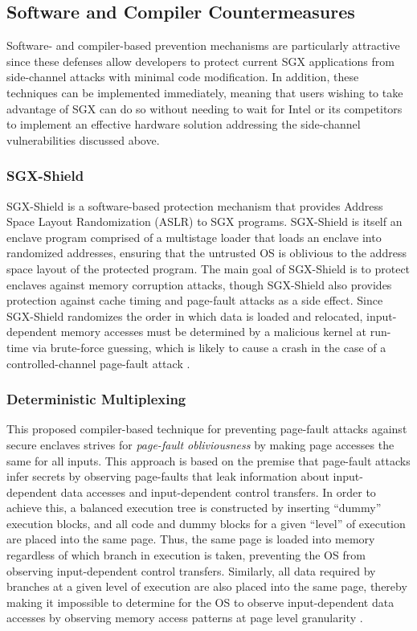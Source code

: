 \subsection{Software and Compiler Countermeasures}

Software- and compiler-based prevention mechanisms are particularly attractive since these defenses allow developers to protect current SGX applications from side-channel attacks with minimal code modification. In addition, these techniques can be implemented immediately, meaning that users wishing to take advantage of SGX can do so without needing to wait for Intel or its competitors to implement an effective hardware solution addressing the side-channel vulnerabilities discussed above.

\subsubsection{SGX-Shield}

SGX-Shield is a software-based protection mechanism that provides Address Space Layout Randomization (ASLR) to SGX programs. SGX-Shield is itself an enclave program comprised of a multistage loader that loads an enclave into randomized addresses, ensuring that the untrusted OS is oblivious to the address space layout of the protected program. The main goal of SGX-Shield is to protect enclaves against memory corruption attacks, though SGX-Shield also provides protection against cache timing and page-fault attacks as a side effect. Since SGX-Shield randomizes the order in which data is loaded and relocated, input-dependent memory accesses must be determined by a malicious kernel at run-time via brute-force guessing, which is likely to cause a crash in the case of a controlled-channel page-fault attack \cite{seo_sgx-shield:_2017}. 

\subsubsection{Deterministic Multiplexing}

This proposed compiler-based technique for preventing page-fault attacks against secure enclaves strives for \emph{page-fault obliviousness} by making page accesses the same for all inputs. This approach is based on the premise that page-fault attacks infer secrets by observing page-faults that leak information about input-dependent data accesses and input-dependent control transfers. In order to achieve this, a balanced execution tree is constructed by inserting ``dummy'' execution blocks, and all code and dummy blocks for a given ``level'' of execution are placed into the same page. Thus, the same page is loaded into memory regardless of which branch in execution is taken, preventing the OS from observing input-dependent control transfers. Similarly, all data required by branches at a given level of execution are also placed into the same page, thereby making it impossible to determine for the OS to observe input-dependent data accesses by observing memory access patterns at page level granularity \cite{shinde_preventing_2015}. 


